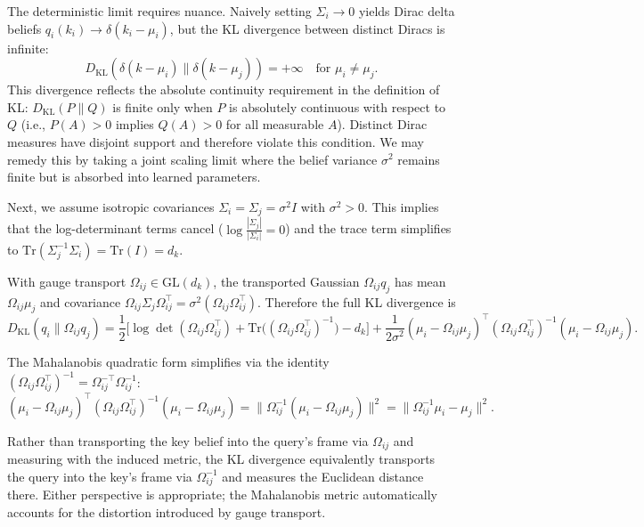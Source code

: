 \documentclass[11pt]{article}
\begin{document}
The deterministic limit requires nuance. Naively setting $\Sigma_i \to 0$ yields Dirac delta beliefs $q_i(k_i) \to \delta(k_i - \mu_i)$, but the KL divergence between distinct Diracs is infinite:
\begin{equation}
D_{\mathrm{KL}}(\delta(k - \mu_i) \| \delta(k - \mu_j)) = +\infty \quad \text{for } \mu_i \neq \mu_j.
\label{eq:dirac_kl}
\end{equation}
This divergence reflects the absolute continuity requirement in the definition of KL: $D_{\mathrm{KL}}(P \| Q)$ is finite only when $P$ is absolutely continuous with respect to $Q$ (i.e., $P(A) > 0$ implies $Q(A) > 0$ for all measurable $A$). Distinct Dirac measures have disjoint support and therefore violate this condition. We may remedy this by taking a joint scaling limit where the belief variance $\sigma^2$ remains finite but is absorbed into learned parameters.

Next, we assume isotropic covariances $\Sigma_i = \Sigma_j = \sigma^2 I$ with $\sigma^2 > 0$. This implies that the log-determinant terms cancel ($\log\frac{|\Sigma_j|}{|\Sigma_i|} = 0$) and the trace term simplifies to $\mathrm{Tr}(\Sigma_j^{-1}\Sigma_i) = \mathrm{Tr}(I) = d_k$.

With gauge transport $\Omega_{ij} \in \mathrm{GL}(d_k)$, the transported Gaussian $\Omega_{ij}q_j$ has mean $\Omega_{ij}\mu_j$ and covariance $\Omega_{ij}\Sigma_j\Omega_{ij}^\top = \sigma^2(\Omega_{ij}\Omega_{ij}^\top)$. Therefore the full KL divergence is
\begin{equation}
D_{\mathrm{KL}}(q_i \| \Omega_{ij}q_j) = \frac{1}{2}\Big[\log\det(\Omega_{ij}\Omega_{ij}^\top) + \mathrm{Tr}\big((\Omega_{ij}\Omega_{ij}^\top)^{-1}\big) - d_k\Big] + \frac{1}{2\sigma^2}(\mu_i - \Omega_{ij}\mu_j)^\top(\Omega_{ij}\Omega_{ij}^\top)^{-1}(\mu_i - \Omega_{ij}\mu_j).
\end{equation}

The Mahalanobis quadratic form simplifies via the identity $(\Omega_{ij}\Omega_{ij}^\top)^{-1} = \Omega_{ij}^{-\top}\Omega_{ij}^{-1}$:
\begin{equation}
(\mu_i - \Omega_{ij}\mu_j)^\top(\Omega_{ij}\Omega_{ij}^\top)^{-1}(\mu_i - \Omega_{ij}\mu_j) = \|\Omega_{ij}^{-1}(\mu_i - \Omega_{ij}\mu_j)\|^2 = \|\Omega_{ij}^{-1}\mu_i - \mu_j\|^2.
\label{eq:mahalanobis_identity}
\end{equation}

Rather than transporting the key belief into the query's frame via $\Omega_{ij}$ and measuring with the induced metric, the KL divergence equivalently transports the query into the key's frame via $\Omega_{ij}^{-1}$ and measures the Euclidean distance there. Either perspective is appropriate; the Mahalanobis metric automatically accounts for the distortion introduced by gauge transport.
\end{document}
